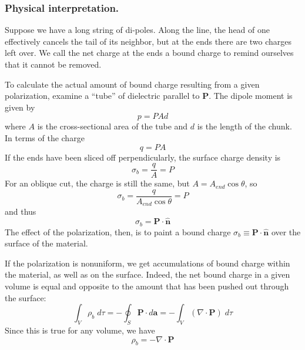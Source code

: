 \documentclass[../../../main.tex]{subfiles}
\begin{document}
\subsubsection*{Physical interpretation.} Suppose we have a long string of di-poles. Along the line, the head of one effectively cancels the tail of its neighbor, but at the ends there are two charges left over. We call the net charge at the ends a bound charge to remind ourselves that it cannot be removed. 

To calculate the actual amount of bound charge resulting from a given polarization, examine a “tube” of dielectric parallel to $\mathbf{P}$. The dipole moment is given by
\begin{equation*}
    p=PAd
\end{equation*}
where $A$ is the cross-sectional area of the tube and $d$ is the length of the chunk. In terms of the charge
\begin{equation*}
    q=PA
\end{equation*}
If the ends have been sliced off perpendicularly, the surface charge density is
\begin{equation*}
    \sigma_b=\frac{q}{A}=P
\end{equation*}
For an oblique cut, the charge is still the same, but $A = A_{end} \cos \theta$, so
\begin{equation*}
    \sigma_b=\frac{q}{A_{end} \cos \theta}=P
\end{equation*}
and thus
\begin{equation*}
    \sigma_b=\mathbf{P}\cdot\mathbf{\hat{n}}
\end{equation*}
The effect of the polarization, then, is to paint a bound charge $\sigma_b\equiv \mathbf{P} \cdot \mathbf{\hat{n}} $ over the surface of the material.

If the polarization is nonuniform, we get accumulations of bound charge within the material, as well as on the surface. Indeed, the net bound charge in a given volume is equal and opposite to the amount that has been pushed out through the surface:
\begin{equation*}
    \int_V\rho_b\;d\tau=-\oint_S\mathbf{P}\cdot d\mathbf{a}=-\int_V(\nabla\cdot\mathbf{P})\;d\tau
\end{equation*}
Since this is true for any volume, we have
\begin{equation*}
    \rho_b=-\nabla\cdot\mathbf{P}
\end{equation*}
\end{document}
